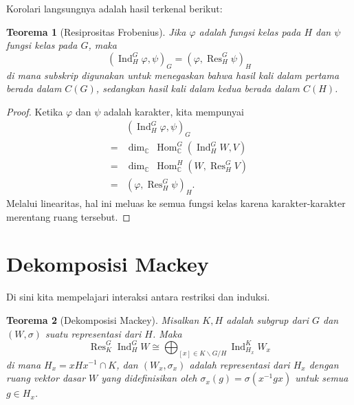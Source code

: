 \documentclass[12pt]{article}
\theoremstyle{plain}
\newtheorem{theorem}{Teorema}[section]
\theoremstyle{definition}
\theoremstyle{remark}
\numberwithin{equation}{section}
\begin{document}
Korolari langsungnya adalah hasil terkenal berikut:

\begin{theorem}[Resiprositas Frobenius]
Jika $\varphi$ adalah fungsi kelas pada $H$ dan $\psi$ fungsi kelas
pada $G$, maka
\[
(\operatorname{Ind}_H^G \varphi, \psi)_G
=
(\varphi, \operatorname{Res}_H^G \psi)_H
\]
di mana subskrip digunakan untuk menegaskan bahwa hasil kali dalam pertama berada dalam $C(G)$,
sedangkan hasil kali dalam kedua berada dalam $C(H)$.
\end{theorem}

\begin{proof}
Ketika $\varphi$ dan $\psi$ adalah karakter,
kita mempunyai
\begin{align*}
&(\operatorname{Ind}_H^G \varphi, \psi)_G\\
=& \dim_\mathbb{C}\ \operatorname{Hom}^G_\mathbb{C}(\operatorname{Ind}_H^G W, V)\\
=& \dim_\mathbb{C}\ \operatorname{Hom}^H_\mathbb{C}(W,\operatorname{Res}_H^G  V)\\
=&(\varphi, \operatorname{Res}_H^G \psi)_H .
\end{align*}
Melalui linearitas, hal ini meluas ke semua fungsi kelas karena karakter-karakter
merentang ruang tersebut.
\end{proof}

\section{Dekomposisi Mackey}

Di sini kita mempelajari interaksi antara restriksi dan induksi.

\begin{theorem}[Dekomposisi Mackey]
Misalkan $K,H$ adalah subgrup dari $G$ dan $(W,\sigma)$ suatu representasi dari
$H$.
Maka
\[
\operatorname{Res}^G_K \operatorname{Ind}^G_H W
\cong
\bigoplus_{[x] \in K\backslash G / H}
\operatorname{Ind}_{H_x}^K W_x
\]
di mana $H_x = xHx^{-1} \cap K$, dan $(W_x,\sigma_x)$ adalah representasi
dari $H_x$ dengan ruang vektor dasar $W$
yang didefinisikan oleh $\sigma_x(g)=\sigma(x^{-1}gx)$ untuk semua $g \in H_x$.
\end{theorem}
\end{document}
